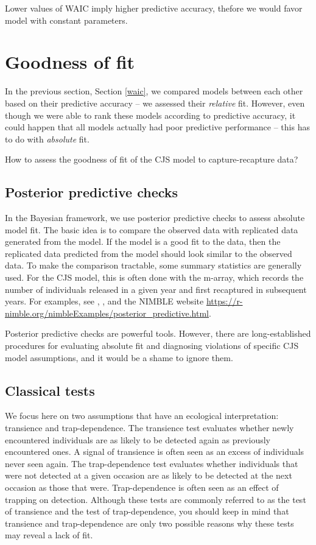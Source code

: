 \documentclass[
  12pt,
]{krantz}
\begin{document}
Lower values of WAIC imply higher predictive accuracy, thefore we would favor model with constant parameters.

\section{Goodness of fit}\label{gof}

In the previous section, Section \ref{waic}, we compared models between each other based on their predictive accuracy -- we assessed their \emph{relative} fit. However, even though we were able to rank these models according to predictive accuracy, it could happen that all models actually had poor predictive performance -- this has to do with \emph{absolute} fit.

How to assess the goodness of fit of the CJS model to capture-recapture data?

\subsection{Posterior predictive checks}\label{posterior-predictive-checks}

In the Bayesian framework, we use posterior predictive checks to assess absolute model fit. The basic idea is to compare the observed data with replicated data generated from the model. If the model is a good fit to the data, then the replicated data predicted from the model should look similar to the observed data. To make the comparison tractable, some summary statistics are generally used. For the CJS model, this is often done with the m-array, which records the number of individuals released in a given year and first recaptured in subsequent years. For examples, see \citet{KerySchaub2011}, \citet{paganin2023computational}, and the NIMBLE website \url{https://r-nimble.org/nimbleExamples/posterior_predictive.html}.

Posterior predictive checks are powerful tools. However, there are long-established procedures for evaluating absolute fit and diagnosing violations of specific CJS model assumptions, and it would be a shame to ignore them.

\subsection{Classical tests}\label{classical-tests}

We focus here on two assumptions that have an ecological interpretation: transience and trap-dependence. The transience test evaluates whether newly encountered individuals are as likely to be detected again as previously encountered ones. A signal of transience is often seen as an excess of individuals never seen again. The trap-dependence test evaluates whether individuals that were not detected at a given occasion are as likely to be detected at the next occasion as those that were. Trap-dependence is often seen as an effect of trapping on detection. Although these tests are commonly referred to as the test of transience and the test of trap-dependence, you should keep in mind that transience and trap-dependence are only two possible reasons why these tests may reveal a lack of fit.
\end{document}
